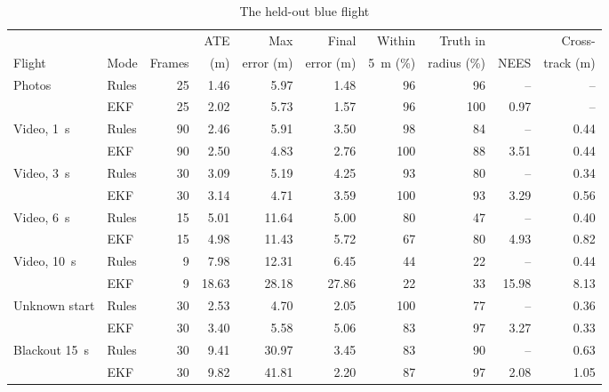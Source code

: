 \documentclass[english, Lau, oneside]{sapthesis}%
\begin{document}
\begin{table}[!htbp]
  \centering
  \caption{The held-out blue flight}
  \label{tab:real-blue}
  \footnotesize\setlength{\tabcolsep}{2.4pt}
  \begin{tabular}{llrrrrrrrr}
    \toprule
     & & & ATE & Max & Final & Within & Truth in & & Cross- \\
    Flight & Mode & Frames & (m) & error (m) & error (m) & 5~m (\%) & radius (\%) & NEES & track (m) \\
    \midrule
    Photos & Rules & 25 & 1.46 & 5.97 & 1.48 & 96 & 96 & -- & -- \\
     & EKF & 25 & 2.02 & 5.73 & 1.57 & 96 & 100 & 0.97 & -- \\
    \addlinespace
    Video, 1~s & Rules & 90 & 2.46 & 5.91 & 3.50 & 98 & 84 & -- & 0.44 \\
     & EKF & 90 & 2.50 & 4.83 & 2.76 & 100 & 88 & 3.51 & 0.44 \\
    \addlinespace
    Video, 3~s & Rules & 30 & 3.09 & 5.19 & 4.25 & 93 & 80 & -- & 0.34 \\
     & EKF & 30 & 3.14 & 4.71 & 3.59 & 100 & 93 & 3.29 & 0.56 \\
    \addlinespace
    Video, 6~s & Rules & 15 & 5.01 & 11.64 & 5.00 & 80 & 47 & -- & 0.40 \\
     & EKF & 15 & 4.98 & 11.43 & 5.72 & 67 & 80 & 4.93 & 0.82 \\
    \addlinespace
    Video, 10~s & Rules & 9 & 7.98 & 12.31 & 6.45 & 44 & 22 & -- & 0.44 \\
     & EKF & 9 & 18.63 & 28.18 & 27.86 & 22 & 33 & 15.98 & 8.13 \\
    \addlinespace
    Unknown start & Rules & 30 & 2.53 & 4.70 & 2.05 & 100 & 77 & -- & 0.36 \\
     & EKF & 30 & 3.40 & 5.58 & 5.06 & 83 & 97 & 3.27 & 0.33 \\
    \addlinespace
    Blackout 15~s & Rules & 30 & 9.41 & 30.97 & 3.45 & 83 & 90 & -- & 0.63 \\
     & EKF & 30 & 9.82 & 41.81 & 2.20 & 87 & 97 & 2.08 & 1.05 \\
    \bottomrule
  \end{tabular}
\end{table}
\end{document}
